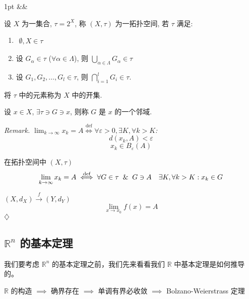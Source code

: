 \documentclass[a4paper]{article}
\newenvironment{formal}[1][]{%
\def\FrameCommand{%
\hspace{1pt}%
{\color{formalline}\vrule width 2pt}%
{\color{formalshade}\vrule width 4pt}%
\colorbox{formalshade}%
}%
\MakeFramed{\advance\hsize-\width\FrameRestore}%
\noindent
\hspace{-4.55pt}%
\begin{adjustwidth}{}{1pt}%
\setlength{\parindent}{0pt}%
\vspace{3pt}%
\ifx&#1&\else %
\textbf{#1}\par
\vspace{1pt}%
\fi }{%
\vspace{2pt}%
\end{adjustwidth}\endMakeFramed%
}
\newenvironment{remark}{%
\par
\smallskip
\noindent
\itshape Remark. }{%
\smallskip
\hfill$\diamondsuit$ \par}
\begin{document}
    \begin{formal}
        [Def (拓扑)] 设 $X$ 为一集合, $\tau = 2^{X}$, 称 $(X, \tau)$ 为一拓扑空间,
        若 $\tau$ 满足:
        \begin{enumerate}[label=(\roman{*})]
            \item $\begin{aligned}
                    \emptyset, X \in \tau
                \end{aligned}$

            \item 设 $G_{\alpha}\in \tau$ ($\forall \alpha \in \Lambda$), 则
                $\bigcup_{\alpha \in \Lambda}G_{\alpha}\in \tau$

            \item 设 $G_{1}, G_{2}, \dots, G_{l}\in \tau$, 则
                $\bigcap_{i=1}^{l}G_{i}\in \tau$.
        \end{enumerate}

        将 $\tau$ 中的元素称为 $X$ 中的开集.

        设 $x \in X$, $\exists \tau \ni G \ni x$, 则称 $G$ 是 $x$ 的一个邻域.
    \end{formal}

    \begin{remark}
        $\lim_{k \to \infty}x_{k}= A \stackrel{\text{def}}{\iff}\forall \varepsilon
        > 0, \exists K, \forall k > K$:
        \[
            d(x_{k}, A) < \varepsilon
        \]
        \[
            x_{k}\in B_{\varepsilon}(A)
        \]

        在拓扑空间中 $(X, \tau)$
        \[
            \lim_{k \to \infty}x_{k}= A \stackrel{\text{def}}{\iff}\forall G \in
            \tau \And G \ni A \quad \exists K, \forall k>K: x_{k}\in G
        \]

        $(X, d_{X}) \xrightarrow{f}(Y, d_{Y})$
        \[
            \lim_{x \to x_0}f(x) = A
        \]
    \end{remark}

    \newpage

    \subsection{$\mathbb{R}^{n}$ 的基本定理}

    我们要考虑 $\mathbb{R}^{n}$ 的基本定理之前，我们先来看看我们 $\mathbb{R}$
    中基本定理是如何推导的。

    $\mathbb{R}$ 的构造 $\implies$ 确界存在 $\implies$ 单调有界必收敛 $\implies$
    Bolzano-Weierstrass 定理
\end{document}
